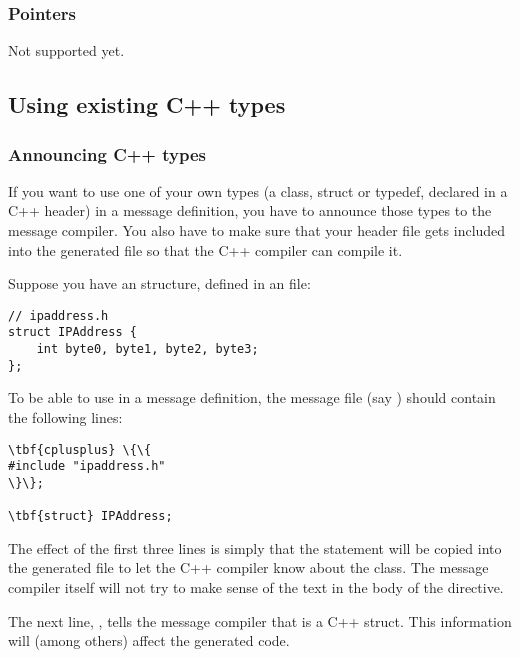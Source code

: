 \subsubsection{Pointers}

Not supported yet.



\subsection{Using existing C++ types}


\subsubsection{Announcing C++ types}

If you want to use one of your own types (a class, struct or typedef,
declared in a C++ header) in a message definition, you have to
announce those types to the message compiler. You also have to make sure
that your header file gets included into the generated  file
so that the C++ compiler can compile it.

Suppose you have an  structure, defined in an 
file:

\begin{verbatim}
// ipaddress.h
struct IPAddress {
    int byte0, byte1, byte2, byte3;
};
\end{verbatim}

To be able to use  in a message definition, the message
file (say ) should contain the following lines:

\begin{Verbatim}[commandchars=\\\{\}]
\tbf{cplusplus} \{\{
#include "ipaddress.h"
\}\};

\tbf{struct} IPAddress;
\end{Verbatim}

The effect of the first three lines is simply that the 
statement will be copied into the generated 
file to let the C++ compiler know about the  class.
The message compiler itself will not try to make sense of the
text in the body of the  directive.

The next line, , tells the message compiler that
 is a C++ struct. This information will (among others)
affect the generated code.

